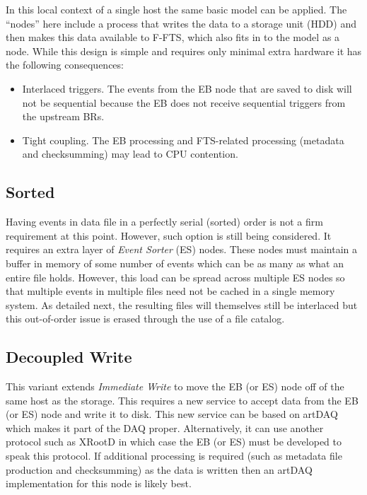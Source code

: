 \documentclass[pdftex,12pt,letter]{article}
\begin{document}
In this local context of a single host the same basic model can be
applied.  The ``nodes'' here include a process that writes the data to
a storage unit (HDD) and then makes this data available to F-FTS,
which also fits in to the model as a node. While this design is simple and requires only minimal extra hardware
it has the following consequences:  

\begin{itemize}

\item Interlaced triggers.  The events from the EB node that are saved
  to disk will not be sequential because the EB does not receive
  sequential triggers from the upstream BRs.

\item Tight coupling.  The EB processing and FTS-related processing
  (metadata and checksumming) may lead to CPU contention.
\end{itemize}

\subsection{Sorted}

Having events in data file in a perfectly serial (sorted) order is not a firm requirement at this point.
However, such option is still being considered. It requires an extra layer of \textit{Event Sorter} (ES) nodes.  These nodes must maintain
a buffer in memory of some number of events which can be as many as
what an entire file holds.  However, this load can be spread across
multiple ES nodes so that multiple events in multiple files need not
be cached in a single memory system.  As detailed next, the resulting
files will themselves still be interlaced but this out-of-order issue
is erased through the use of a file catalog.

\subsection{Decoupled Write}

This variant extends \textit{Immediate Write} to move the EB (or ES)
node off of the same host as the storage.  This requires a new service
to accept data from the EB (or ES) node and write it to disk.  This
new service can be based on artDAQ which makes it part of the DAQ
proper.  Alternatively, it can use another protocol such as XRootD in
which case the EB (or ES) must be developed to speak this protocol.
If additional processing is required (such as metadata file production
and checksumming) as the data is written then an artDAQ implementation
for this node is likely best.
\end{document}
